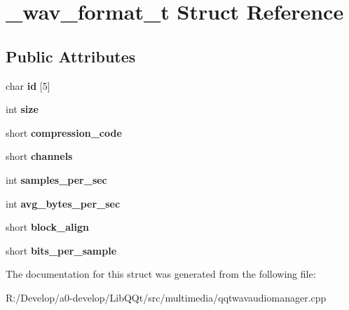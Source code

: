 \hypertarget{struct__wav__format__t}{}\section{\+\_\+wav\+\_\+format\+\_\+t Struct Reference}
\label{struct__wav__format__t}
\subsection*{Public Attributes}
\begin{DoxyCompactItemize}
\item 
\mbox{\label{struct__wav__format__t_a36ec793a30c06fd68c98b8a899b78fdb}} 
char {\bfseries id} \mbox{[}5\mbox{]}
\item 
\mbox{\label{struct__wav__format__t_a582718167792f58c3b6fb3bb15e76505}} 
int {\bfseries size}
\item 
\mbox{\label{struct__wav__format__t_a7c759d63065ba119e02f1012722ef4f1}} 
short {\bfseries compression\+\_\+code}
\item 
\mbox{\label{struct__wav__format__t_a15b93ee0bc7687c05a5c87e7b8fdb07d}} 
short {\bfseries channels}
\item 
\mbox{\label{struct__wav__format__t_a14229224c88e4db3d53d70ef3833a552}} 
int {\bfseries samples\+\_\+per\+\_\+sec}
\item 
\mbox{\label{struct__wav__format__t_ad8fb3eba822a5b1024944c7efc1b68de}} 
int {\bfseries avg\+\_\+bytes\+\_\+per\+\_\+sec}
\item 
\mbox{\label{struct__wav__format__t_a45c559016013a3141a4393e75446b3ae}} 
short {\bfseries block\+\_\+align}
\item 
\mbox{\label{struct__wav__format__t_a39e9b84e88598f2c6774f65784a953b0}} 
short {\bfseries bits\+\_\+per\+\_\+sample}
\end{DoxyCompactItemize}


The documentation for this struct was generated from the following file\+:\begin{DoxyCompactItemize}
\item 
R\+:/\+Develop/a0-\/develop/\+Lib\+Q\+Qt/src/multimedia/qqtwavaudiomanager.\+cpp\end{DoxyCompactItemize}
